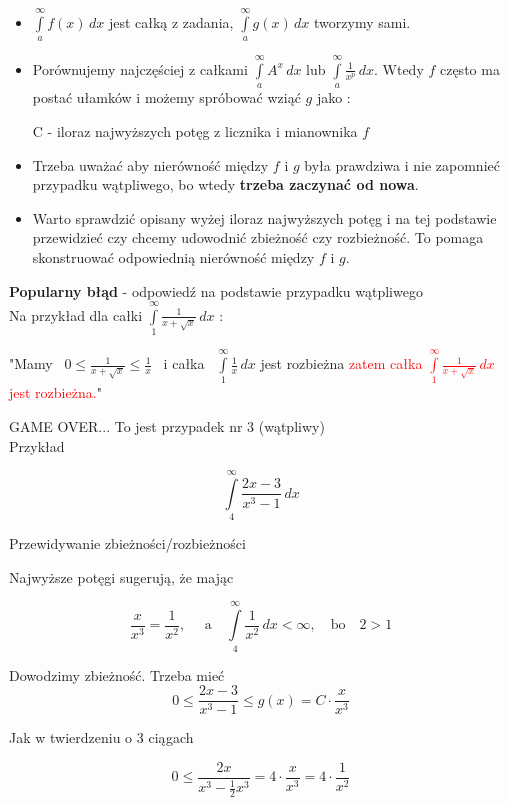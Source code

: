\begin{itemize}
    \item $ \int\limits_{a}^{\infty} f(x) \,dx $ jest całką z zadania, $ \int\limits_{a}^{\infty} g(x) \,dx $ tworzymy sami.
    \item Porównujemy najczęściej z całkami $ \int\limits_{a}^{\infty} A^x \,dx $ lub 
    $ \int\limits_{a}^{\infty} \frac{1}{x^p} \,dx $. Wtedy $f$ często ma postać ułamków i możemy spróbować
    wziąć $g$ jako :

    \quad C - iloraz najwyższych potęg z licznika i mianownika $f$

    \item Trzeba uważać aby nierówność między $f$ i $g$ była prawdziwa i nie zapomnieć przypadku wątpliwego, bo wtedy
    \textbf{trzeba zaczynać od nowa}.

    \item Warto sprawdzić opisany wyżej iloraz najwyższych potęg i na tej podstawie przewidzieć czy chcemy
    udowodnić zbieżność czy rozbieżność. To pomaga skonstruować odpowiednią nierówność między $f$ i $g$.
\end{itemize}

\textbf{Popularny błąd} - odpowiedź na podstawie przypadku wątpliwego \\

Na przykład dla całki $ \int\limits_1^\infty \frac{1}{x + \sqrt{x}} \,dx $ : 

"Mamy \ $ 0 \leq \frac{1}{x + \sqrt{x}} \leq \frac{1}{x} $ \ i całka \ $ \int\limits_1^\infty \frac{1}{x} \,dx $
jest rozbieżna \textcolor{red}{zatem całka $ \int\limits_{1}^{\infty} \frac{1}{x + \sqrt{x}} \,dx $ jest rozbieżna.}"

GAME OVER... To jest przypadek nr 3 (wątpliwy) \\

Przykład

$$ \int\limits_4^\infty \frac{2x - 3}{x^3 - 1} \,dx $$

Przewidywanie zbieżności/rozbieżności

Najwyższe potęgi sugerują, że mając

$$ \frac{x}{x^3} = \frac{1}{x^2}, \quad \textrm{ a} \quad \int\limits_4^\infty \frac{1}{x^2} \,dx < \infty, \quad \textrm{bo} \quad 2 > 1 $$

Dowodzimy zbieżność. Trzeba mieć
$$ 0 \leq \frac{2x - 3}{x^3 - 1} \leq g(x) = C \cdot \frac{x}{x^3} $$

Jak w twierdzeniu o 3 ciągach

$$ 0 \leq \frac{2x}{x^3 - \frac{1}{2}x^3} = 4 \cdot \frac{x}{x^3} = 4 \cdot \frac{1}{x^2} $$

